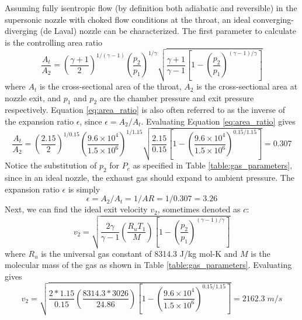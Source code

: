 \documentclass[9pt]{article} %
\numberwithin{equation}{section} %
\begin{document}
Assuming fully isentropic flow (by definition both adiabatic and reversible) in the supersonic nozzle with choked flow conditions at the throat, an ideal converging-diverging (de Laval) nozzle can be characterized. The first parameter to calculate is the controlling area ratio
\begin{equation} \label{eq:area_ratio}
\frac{A_{t}}{A_{2}} = \left( \frac{\gamma + 1}{2} \right) ^{1/(\gamma - 1)} \left( \frac{p_{2}}{p_{1}} \right) ^{1/\gamma} \sqrt{ \frac{\gamma + 1}{\gamma - 1} \left[ 1 - \left( \frac{p_{2}}{p_{1}} \right) ^{(\gamma - 1)/\gamma} \right] }
\end{equation}
where $A_{t}$ is the cross-sectional area of the throat, $A_{2}$ is the cross-sectional area at nozzle exit, and $p_{1}$ and $p_{2}$ are the chamber pressure and exit pressure respectively. Equation \ref{eq:area_ratio} is also often referred to as the inverse of the expansion ratio $\epsilon$, since $\epsilon = A_{2}/A_{t}$. Evaluating Equation \ref{eq:area_ratio} gives
\begin{equation*} 
\frac{A_{t}}{A_{2}} = \left( \frac{2.15}{2} \right) ^{1/0.15} \left( \frac{9.6 \times 10^{4}}{1.5 \times 10^{6}} \right) ^{1/1.15} \sqrt{ \frac{2.15}{0.15} \left[ 1 - \left( \frac{9.6 \times 10^{4}}{1.5 \times 10^{6}} \right) ^{0.15/1.15} \right] } = 0.307
\end{equation*}
Notice the substitution of $p_{2}$ for $P_{e}$ as specified in Table \ref{table:gas_parameters}, since in an ideal nozzle, the exhaust gas should expand to ambient pressure. The expansion ratio $\epsilon$ is simply
\begin{equation*}
\epsilon = A_{2}/A_{t} = 1/AR = 1/0.307 = 3.26
\end{equation*}
Next, we can find the ideal exit velocity $v_{2}$, sometimes denoted as $c$:
\begin{equation} \label{eq:exit_velocity}
v_{2} = \sqrt{ \frac{2\gamma}{\gamma - 1} \left( \frac{R_{u}T_{1}}{M} \right) \left[ 1- \left( \frac{p_{2}}{p_{1}} \right) ^{(\gamma - 1)/\gamma} \right] }
\end{equation}
where $R_{u}$ is the universal gas constant of 8314.3 J/kg mol-K and $M$ is the molecular mass of the gas as shown in Table \ref{table:gas_parameters}. Evaluating gives
\begin{equation*} 
v_{2} = \sqrt{ \frac{2 * 1.15}{0.15} \left( \frac{8314.3 * 3026}{24.86} \right) \left[ 1- \left( \frac{9.6 \times 10^{4}}{1.5 \times 10^{6}} \right) ^{0.15/1.15} \right] } = 2162.3 \; m/s
\end{equation*}
\end{document}
